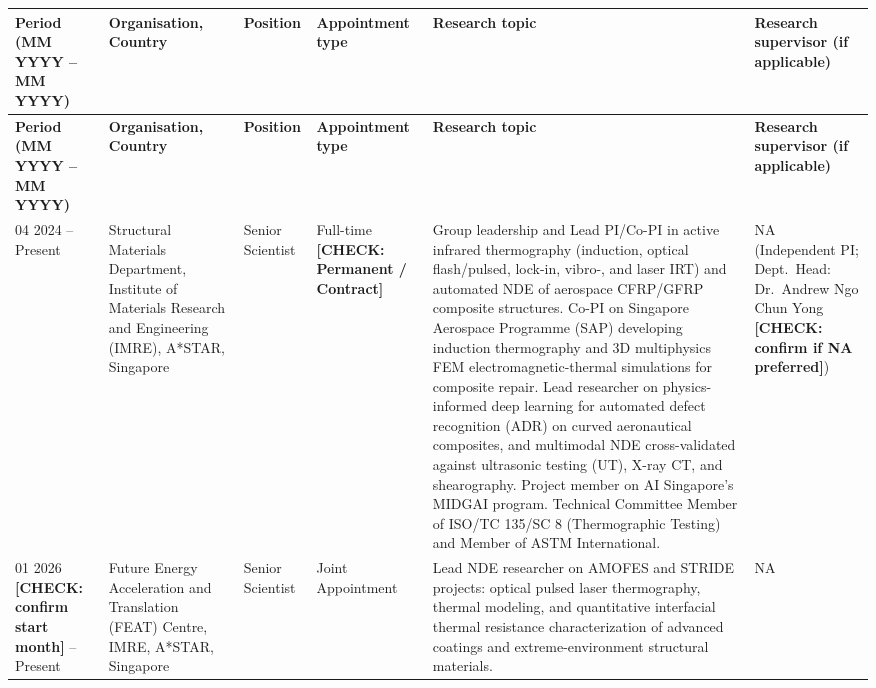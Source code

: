 \documentclass[10pt,a4paper]{article}
\newcommand{\todo}[1]{\textbf{[CHECK: #1]}}
\begin{document}
\vspace{-4pt}
{\footnotesize
\renewcommand{\arraystretch}{1.18}
\setlength{\tabcolsep}{3.5pt}
\begin{tabularx}{\textwidth}{@{} >{\raggedright\arraybackslash}p{1.95cm} >{\raggedright\arraybackslash}p{2.90cm} >{\raggedright\arraybackslash}p{1.95cm} >{\raggedright\arraybackslash}p{1.95cm} >{\raggedright\arraybackslash}X >{\raggedright\arraybackslash}p{2.10cm} @{}}
\toprule
\textbf{Period (MM YYYY -- MM YYYY)} & \textbf{Organisation, Country} & \textbf{Position} & \textbf{Appointment type} & \textbf{Research topic} & \textbf{Research supervisor (if applicable)} \\
\midrule
\endfirsthead
\toprule
\textbf{Period (MM YYYY -- MM YYYY)} & \textbf{Organisation, Country} & \textbf{Position} & \textbf{Appointment type} & \textbf{Research topic} & \textbf{Research supervisor (if applicable)} \\
\midrule
\endhead
\bottomrule
\endfoot

04 2024 -- Present &
Structural Materials Department, Institute of Materials Research and Engineering (IMRE), A*STAR, Singapore &
Senior Scientist &
Full-time \todo{Permanent / Contract} &
Group leadership and Lead PI/Co-PI in active infrared thermography (induction, optical flash/pulsed, lock-in, vibro-, and laser IRT) and automated NDE of aerospace CFRP/GFRP composite structures. Co-PI on Singapore Aerospace Programme (SAP) developing induction thermography and 3D multiphysics FEM electromagnetic-thermal simulations for composite repair. Lead researcher on physics-informed deep learning for automated defect recognition (ADR) on curved aeronautical composites, and multimodal NDE cross-validated against ultrasonic testing (UT), X-ray CT, and shearography. Project member on AI Singapore's MIDGAI program. Technical Committee Member of ISO/TC 135/SC 8 (Thermographic Testing) and Member of ASTM International. &
NA (Independent PI; Dept.\ Head: Dr.\ Andrew Ngo Chun Yong \todo{confirm if NA preferred}) \\
\midrule

01 2026 \todo{confirm start month} -- Present &
Future Energy Acceleration and Translation (FEAT) Centre, IMRE, A*STAR, Singapore &
Senior Scientist &
Joint Appointment &
Lead NDE researcher on AMOFES and STRIDE projects: optical pulsed laser thermography, thermal modeling, and quantitative interfacial thermal resistance characterization of advanced coatings and extreme-environment structural materials. &
NA \\
\midrule


\end{tabularx}}
\end{document}
